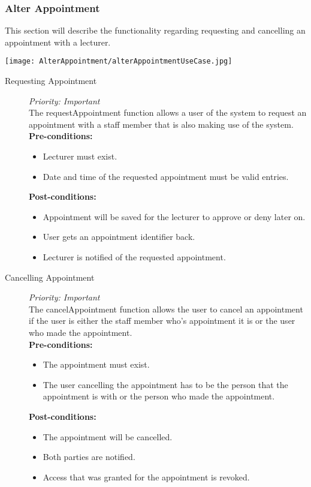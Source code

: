 \subsubsection{Alter Appointment}

This section will describe the functionality regarding  requesting and cancelling an appointment with a lecturer.

\texttt{[image: AlterAppointment/alterAppointmentUseCase.jpg]}

\begin{description}

\item[Requesting Appointment]\hfill \textit{Priority: Important} \\
The requestAppointment function allows a user of the system to request an appointment with a staff member that is also making use of the system. \\

\textbf{Pre-conditions:} 
	\begin{itemize}
		\item Lecturer must exist.
		\item Date and time of the requested appointment must be valid entries.
	\end{itemize}
\textbf{Post-conditions:} 
	\begin{itemize}
		\item Appointment will be saved for the lecturer to approve or deny later on.
		\item User gets an appointment identifier back.
		\item Lecturer is notified of the requested appointment. 
	\end{itemize}
\end{description}

\begin{description}

\item[Cancelling Appointment]\hfill \textit{Priority: Important} \\
The cancelAppointment function allows the user to cancel an appointment if the user is either the staff member who's appointment it is or the user who made the appointment.  \\

\textbf{Pre-conditions:} 
	\begin{itemize}
		\item The appointment must exist.
		\item The user cancelling the appointment has to be the person that the appointment is with or the person who made the appointment.
	\end{itemize}
\textbf{Post-conditions:}
	\begin{itemize}
		\item The appointment will be cancelled.
		\item  Both parties are notified.
		\item Access that was granted for the appointment is revoked. 
	\end{itemize}

\end{description}